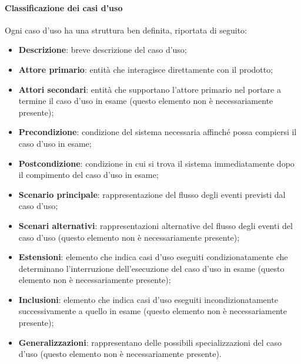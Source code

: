 \paragraph{Classificazione dei casi d'uso}
\label{par:classificazione_casi_duso}

Ogni caso d'uso ha una struttura ben definita, riportata di seguito:
\begin{itemize}
    \item \textbf{Descrizione}: breve descrizione del caso d'uso;
    \item \textbf{Attore primario}: entità che interagisce direttamente con il prodotto;
    \item \textbf{Attori secondari}: entità che supportano l'attore primario nel portare a termine il caso d'uso in
    	esame (questo elemento non è necessariamente presente);
    \item \textbf{Precondizione}: condizione del sistema necessaria affinché possa compiersi il caso d'uso in esame;
    \item \textbf{Postcondizione}: condizione in cui si trova il sistema immediatamente dopo il compimento del caso
    d'uso in esame;
    \item \textbf{Scenario principale}: rappresentazione del flusso degli eventi previsti dal caso d'uso;
    \item \textbf{Scenari alternativi}: rappresentazioni alternative del flusso degli eventi del caso d'uso (questo
    	elemento non è necessariamente presente);
    \item \textbf{Estensioni}: elemento che indica casi d'uso eseguiti condizionatamente che determinano l'interruzione
    	dell'esecuzione del caso d'uso in esame (questo elemento non è necessariamente presente);
    \item \textbf{Inclusioni}: elemento che indica casi d'uso eseguiti incondizionatamente successivamente a quello in
    	esame (questo elemento non è necessariamente presente);
    \item \textbf{Generalizzazioni}: rappresentano delle possibili specializzazioni del caso d'uso (questo elemento non è necessariamente
    	presente).
\end{itemize}

